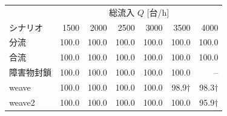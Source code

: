 \begin{tabular}{lrrrrrr}
\hline \hline
 & \multicolumn{6}{c}{総流入 $Q$ [台/h]} \\
シナリオ & 1500 & 2000 & 2500 & 3000 & 3500 & 4000 \\
\hline
分流 & 100.0 & 100.0 & 100.0 & 100.0 & 100.0 & 100.0 \\
合流 & 100.0 & 100.0 & 100.0 & 100.0 & 100.0 & 100.0 \\
障害物封鎖 & 100.0 & 100.0 & 100.0 & 100.0 & 100.0 & -- \\
weave & 100.0 & 100.0 & 100.0 & 100.0 & 98.9$\dagger$ & 98.3$\dagger$ \\
weave2 & 100.0 & 100.0 & 100.0 & 100.0 & 100.0 & 95.9$\dagger$ \\
\hline
\end{tabular}
